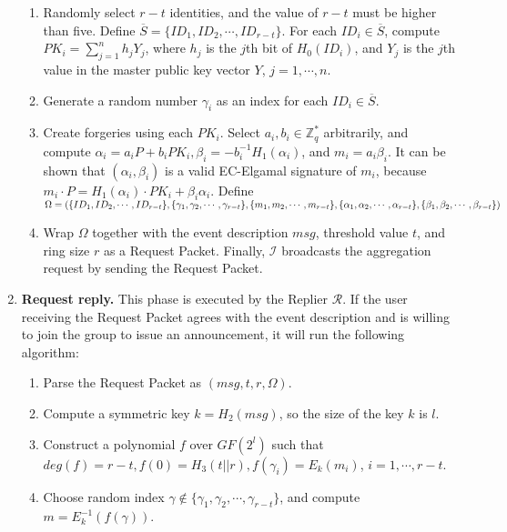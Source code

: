 \documentclass[a4paper]{article}
\begin{document}
\begin{enumerate}
        \begin{enumerate}
        \item Randomly select $r-t$ identities, and the value of $r-t$ must be higher than five. Define $\overline{S} = \{ID_1, ID_2, \cdots, ID_{r-t}\}$. For each $ID_i \in \overline{S}$, compute $PK_i = \sum_{j=1}^n {h_j}{Y_j}$, where $h_j$ is the $j$th bit of $H_0(ID_i)$, and $Y_j$ is the $j$th value in the master public key vector $Y$, $j = 1,\cdots, n$.
        \item Generate a random number $\gamma_i$ as an index for each $ID_i \in \overline{S}$.
        \item Create forgeries using each $PK_i$. Select $a_i, b_i \in \mathbb{Z}_{q}^{*}$ arbitrarily, and compute $\alpha_i = a_i P + b_i PK_i, \beta_i = -b_i^{-1} H_1(\alpha_i)$, and $m_i = a_i \beta_i$. It can be shown that $(\alpha_i, \beta_i)$ is a valid EC-Elgamal signature of $m_i$, because $m_i \cdot P = H_1(\alpha_i) \cdot PK_i + \beta_i \alpha_i$. Define $\Omega = (\{ID_1, ID_2, \cdots, ID_{r-t}\}, \\
            \{\gamma_1, \gamma_2, \cdots, \gamma_{r-t}\}, \{m_1, m_2, \cdots, m_{r-t}\}, \\
            \{\alpha_1, \alpha_2, \cdots, \alpha_{r-t}\}, \{\beta_1, \beta_2, \cdots, \beta_{r-t}\})$
        \item Wrap $\Omega$ together with the event description $msg$, threshold value $t$, and ring size $r$ as a Request Packet. Finally, $\mathcal{I}$ broadcasts the aggregation request by sending the Request Packet.
        \end{enumerate}
 \item \textbf{Request reply.} This phase is executed by the Replier $\mathcal{R}$. If the user receiving the Request Packet agrees with the event description and is willing to join the group to issue an announcement, it will run the following algorithm:
        \begin{enumerate}
        \item Parse the Request Packet as $(msg, t, r, \Omega)$.
        \item Compute a symmetric key $k = H_2(msg)$, so the size of the key $k$ is $l$.
        \item Construct a polynomial $f$ over $GF(2^l)$ such that $deg(f) = r - t, f(0) = H_3(t||r), 
        f(\gamma_i) = E_k(m_i)$, $i = 1,\cdots, r-t$.
        \item Choose random index $\gamma \notin \{\gamma_1, \gamma_2, \cdots, \gamma_{r-t}\}$, and compute $m = E_k^{-1}(f(\gamma))$.

\end{enumerate}
\end{enumerate}
\end{document}
